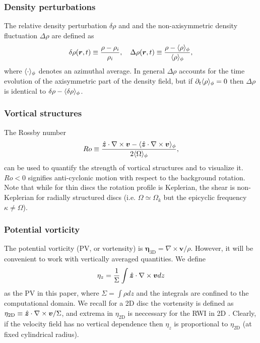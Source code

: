 \subsubsection{Density perturbations}
The relative density perturbation $\delta\rho$ and 
and the non-axisymmetric density fluctuation $\Delta\rho$ are defined as 
\begin{align}
  \delta\rho(\bm{r},t) \equiv \frac{\rho - \rho_i}{\rho_i}, \quad
  \Delta\rho(\bm{r},t) \equiv \frac{\rho -
    \langle \rho \rangle_\phi}{\langle \rho \rangle_\phi}, 
\end{align} 
where $\langle \cdot \rangle_\phi$ denotes an azimuthal average.  
In general $\Delta\rho$ accounts for the time evolution of 
the axisymmetric part of the density field, but if
$\partial_t\langle \rho \rangle_\phi=0$ then $\Delta\rho$ is identical to
$\delta\rho-\langle \delta\rho \rangle_\phi$.    

\subsubsection{Vortical structures}
The Rossby number
\begin{align}
  Ro \equiv
  \frac{\hat{\bm{z}}\cdot\nabla\times\bm{v}-\langle \hat{\bm{z}}\cdot\nabla\times\bm{v} \rangle_\phi}{2\langle \Omega \rangle_\phi},   
\end{align} 
can be used to quantify the strength of vortical structures and to
visualize it. $Ro<0$ signifies anti-cyclonic motion with respect to
the background rotation. Note that while for thin discs 
the rotation profile is Keplerian, the shear is non-Keplerian for radially  
structured discs (i.e. $\Omega\simeq\Omega_k$ but the epicyclic
frequency $\kappa\neq\Omega$). 

\subsubsection{Potential vorticity}
The potential vorticity (PV, or vortensity) is 
$  \bm{\eta}_\mathrm{3D} = \nabla\times\bm{v}/\rho$. 
However, it will be convenient to work with vertically averaged
quantities. We define  
\begin{align}
  \eta_z = \frac{1}{\Sigma}\int \hat{\bm{z}}\cdot\nabla\times\bm{v} dz
\end{align}
as the PV in this paper, where $\Sigma = \int\rho dz$ and the
integrals are confined to the computational domain. 
We recall for a 2D disc the vortensity is defined as 
$\eta_\mathrm{2D} \equiv \hat{\bm{z}}\cdot\nabla\times\bm{v}/\Sigma$, and
extrema in $\eta_\mathrm{2D}$ is neccessary for the RWI in
2D \citep{lovelace99,lin10}. Clearly, if the velocity field has no
vertical dependence then $\eta_z$ is proportional to
$\eta_\mathrm{2D}$ (at fixed cylindrical radius).   

